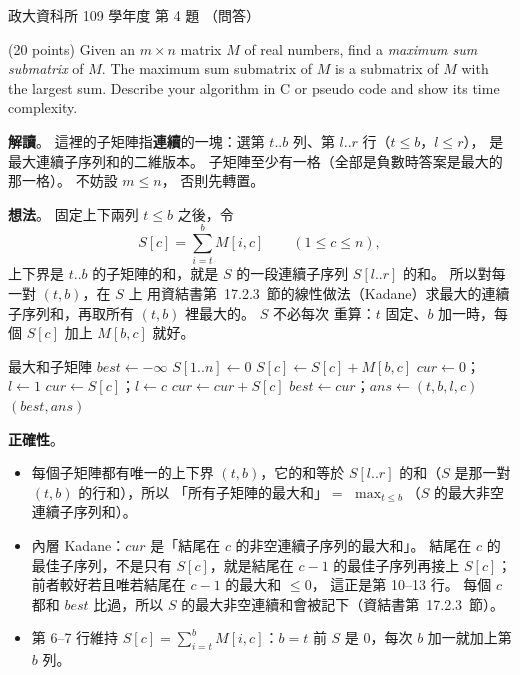 \begin{pastexam}[label={px:nccu-109-dsa-04}]{政大資科所 109 學年度 第 4 題}
（問答）

(20 points) Given an $m\times n$ matrix $M$ of real numbers, find a \textit{maximum sum submatrix} of
$M$. The maximum sum submatrix of $M$ is a submatrix of $M$ with the largest sum. Describe your
algorithm in C or pseudo code and show its time complexity.
\end{pastexam}

\begin{pastsoln}
\textbf{解讀}。 這裡的子矩陣指\textbf{連續}的一塊：選第 $t..b$ 列、第 $l..r$ 行（$t \le b$，$l \le r$），
是最大連續子序列和的二維版本。 子矩陣至少有一格（全部是負數時答案是最大的那一格）。 不妨設 $m \le n$，
否則先轉置。

\textbf{想法}。 固定上下兩列 $t \le b$ 之後，令
\[
S[c] = \sum_{i=t}^{b} M[i, c] \qquad (1 \le c \le n),
\]
上下界是 $t..b$ 的子矩陣的和，就是 $S$ 的一段連續子序列 $S[l..r]$ 的和。 所以對每一對 $(t, b)$，在 $S$ 上
用資結書第~17.2.3~節的線性做法（Kadane）求最大的連續子序列和，再取所有 $(t, b)$ 裡最大的。 $S$ 不必每次
重算：$t$ 固定、$b$ 加一時，每個 $S[c]$ 加上 $M[b, c]$ 就好。

\begin{pseudo}{最大和子矩陣}
    \State $\mathit{best} \gets -\infty$
        \State $S[1..n] \gets 0$
                \State $S[c] \gets S[c] + M[b, c]$ 
            \EndFor
            \State $\mathit{cur} \gets 0$；$l \gets 1$
             
                    \State $\mathit{cur} \gets S[c]$；$l \gets c$ 
                \Else
                    \State $\mathit{cur} \gets \mathit{cur} + S[c]$
                \EndIf
                    \State $\mathit{best} \gets \mathit{cur}$；$\mathit{ans} \gets (t, b, l, c)$
                \EndIf
            \EndFor
        \EndFor
    \EndFor
    \State \Return $(\mathit{best}, \mathit{ans})$ 
\EndFunction
\end{pseudo}

\textbf{正確性}。
\begin{itemize}
\item 每個子矩陣都有唯一的上下界 $(t, b)$，它的和等於 $S[l..r]$ 的和（$S$ 是那一對 $(t, b)$ 的行和），所以
「所有子矩陣的最大和」$=$ $\max_{t \le b}$（$S$ 的最大非空連續子序列和）。
\item 內層 Kadane：$\mathit{cur}$ 是「結尾在 $c$ 的非空連續子序列的最大和」。 結尾在 $c$ 的最佳子序列，不是只有
$S[c]$，就是結尾在 $c - 1$ 的最佳子序列再接上 $S[c]$；前者較好若且唯若結尾在 $c - 1$ 的最大和 $\le 0$，
這正是第 10--13 行。 每個 $c$ 都和 $\mathit{best}$ 比過，所以 $S$ 的最大非空連續和會被記下（資結書第~17.2.3~節）。
\item 第 6--7 行維持 $S[c] = \sum_{i=t}^{b} M[i, c]$：$b = t$ 前 $S$ 是 $0$，每次 $b$ 加一就加上第 $b$ 列。
\end{itemize}


\end{pastsoln}
